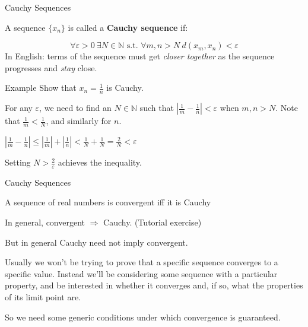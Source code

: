 \documentclass[11pt, xcolor={dvipsnames}, hyperref={colorlinks, allcolors=Blue}]{beamer}
\newcommand\bc[1]{{\usebeamercolor[fg]{frametitle} {\textbf{#1}}}} %
\newcommand{\N}{\mathbb{N}}
\renewcommand{\epsilon}{\varepsilon}
\renewcommand{\implies}{\Rightarrow}
\newcounter{exercise}
\begin{document}

\begin{frame}{Cauchy Sequences}

A sequence $\{x_{n}\}$ is called a \bc{Cauchy sequence} if:

\[ \forall \epsilon > 0 \ \exists N\in \N \text{ s.t. } \forall m,n > N \ d(x_{m}, x_{n}) < \epsilon\]
\smallskip
In English: terms of the sequence must get \emph{closer together} as the sequence progresses and \emph{stay} close.

\begin{block}{Example}
Show that $x_n = \frac{1}{n}$ is Cauchy.\bigskip

For any $\epsilon$, we need to find an $N\in\N$ such that $|\frac{1}{m} - \frac{1}{n}| < \epsilon$ when $m,n > N$. Note that $\frac{1}{m} < \frac{1}{N}$, and similarly for $n$. \medskip

$|\frac{1}{m} - \frac{1}{n}| \leq |\frac{1}{m}| + |\frac{1}{n}| < \frac{1}{N} + \frac{1}{N} = \frac{2}{N} < \epsilon$
\medskip

Setting $N > \frac{2}{\epsilon}$ achieves the inequality.
\end{block}

\vfill\vspace{\fill}
\end{frame}


\begin{frame}{Cauchy Sequences}

\begin{theorem}
A sequence of real numbers is convergent iff it is Cauchy
\end{theorem}
\bigskip

In general, convergent $\implies$ Cauchy. (Tutorial exercise)\bigskip

But in general Cauchy need not imply convergent.\bigskip

Usually we won't be trying to prove that a specific sequence converges to a specific value. Instead we'll be considering some sequence with a particular property, and be interested in whether it converges and, if so, what the properties of its limit point are.\bigskip

So we need some generic conditions under which convergence is guaranteed.

\vfill\vspace{\fill}
\end{frame}
\end{document}
